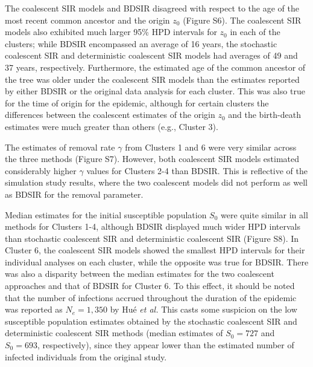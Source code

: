 \documentclass[10pt]{article}
\newcommand{\St}{\mathcal{S}}
\newcommand{\It}{\mathcal{I}}
\newcommand{\stochCoalSIR}{stochastic coalescent SIR}
\newcommand{\deterCoalSIR}{deterministic coalescent SIR}
\newcommand{\BDSIR}{BDSIR}
\begin{document}
The coalescent SIR models and \BDSIR{} disagreed with respect to the age of the most recent common ancestor and the origin $z_0$ (Figure S6).  The coalescent SIR models also exhibited much larger 95\% HPD intervals for $z_0$ in each of the clusters; 
while \BDSIR{} encompassed an average of 16 years, the \stochCoalSIR{} and \deterCoalSIR{} models had averages of 49 and 37 years, respectively.   
Furthermore, the estimated age of the common ancestor of the tree was older under the coalescent SIR
models than the estimates reported by either \BDSIR{} or the original data analysis \citep{Hue:2005} for each cluster.  This was also true for the time of origin for the epidemic, 
although for certain clusters the differences between the coalescent estimates of the origin $z_0$ and the birth-death estimates were much greater than others (e.g., Cluster 3).   

The estimates of removal rate $\gamma$ 
from Clusters 1 and 6 were very similar across the three methods (Figure S7).  However, both coalescent SIR
models estimated considerably higher $\gamma$ values for Clusters 2-4 than BDSIR.  This is reflective of the simulation study results, where the two coalescent models 
did not perform as well as \BDSIR{} for the removal parameter.

Median estimates for the initial susceptible population $S_0$ were quite similar in all methods for Clusters 1-4, although \BDSIR{} displayed much wider HPD intervals than \stochCoalSIR{} and \deterCoalSIR{} (Figure S8).
In Cluster 6, the coalescent SIR models showed the smallest HPD intervals for their individual analyses on each cluster, while the opposite was true for \BDSIR{}.  
There was also a disparity between the median estimates for the two coalescent approaches and that of \BDSIR{} for Cluster 6. 
To this effect, it should be noted that the 
number of infections accrued throughout the duration of the epidemic was reported as $N_{e}=1,350$ by Hu{\'e} \textit{et al.}  %
This casts some suspicion on the low susceptible population estimates obtained by the \stochCoalSIR{} and 
\deterCoalSIR{} methods (median estimates of $S_{0}=727$ and $S_{0}=693$, respectively), since they appear lower than the estimated number of infected individuals from the original study.
\end{document}
